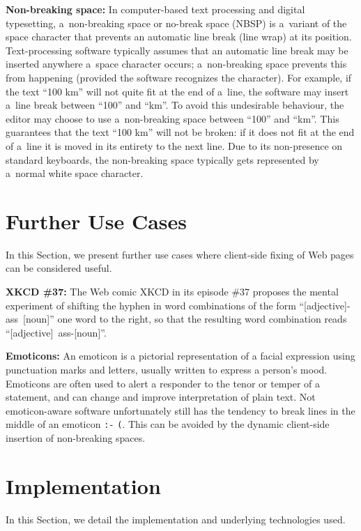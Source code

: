 \documentclass{acm_proc_article-sp}
\begin{document}
\textbf{Non-breaking space:} In computer-based text processing and digital typesetting,
a~non-breaking space or no-break space (NBSP) is a~variant of the space character that prevents an automatic line break (line wrap) at its position.
Text-processing software typically assumes that an automatic line break may be inserted anywhere a~space
character occurs;
a~non-breaking space prevents this from happening (provided the software recognizes the character).
For example, if the text ``100 km'' will not quite fit at the end of a~line,
the software may insert a~line break between ``100'' and ``km''.
To avoid this undesirable behaviour, the editor may choose to use a~non-breaking space between ``100'' and ``km''.
This guarantees that the text ``100 km'' will not be broken:
if it does not fit at the end of a~line
it is moved in its entirety to the next line.
Due to its non-presence on standard keyboards,
the non-breaking space typically gets represented by a~normal white space character.

\section{Further Use Cases}
In this Section, we present further use cases where client-side fixing of Web pages can be considered useful.

\textbf{XKCD \#37:} The Web comic XKCD in its episode \#37 proposes the mental experiment of shifting the hyphen in word combinations of the form \mbox{``[adjective]-ass [noun]''} one word to the right,
so that the resulting word combination reads \mbox{``[adjective] ass-[noun]''}.

\textbf{Emoticons:} An emoticon is a pictorial representation of a facial expression using punctuation marks and letters,
usually written to express a person's mood.
Emoticons are often used to alert a responder to the tenor or temper of a statement,
and can change and improve interpretation of plain text.
Not emoticon-aware software unfortunately still has the tendency to break lines in the middle of an emoticon \texttt{:-} \linebreak %
\texttt{(}. This can be avoided by the dynamic client-side insertion of non-breaking spaces.

\section{Implementation}
In this Section, we detail the implementation and underlying technologies used.
\end{document}
